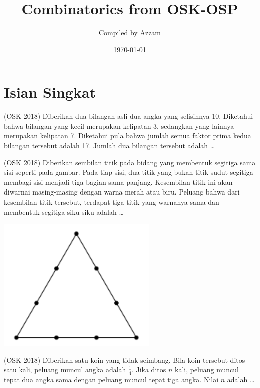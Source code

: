 \documentclass[11pt]{scrartcl}
\begin{document}
	\title{Combinatorics from OSK-OSP} %
	\date{\today}
	\author{Compiled by Azzam}
	\maketitle
	\section{Isian Singkat}
	
	\begin{soalbaru}(OSK 2018) Diberikan dua bilangan asli dua angka yang selisihnya 10. Diketahui bahwa bilangan yang kecil merupakan kelipatan 3, sedangkan yang lainnya merupakan kelipatan 7. Diketahui pula bahwa jumlah semua faktor prima kedua bilangan tersebut adalah 17. Jumlah dua bilangan tersebut adalah \dots
	
	\end{soalbaru}
	
	\begin{soalbaru}(OSK 2018)
Diberikan sembilan titik pada bidang yang membentuk segitiga sama sisi seperti pada gambar. Pada tiap
sisi, dua titik yang bukan titik sudut segitiga membagi sisi menjadi tiga bagian sama panjang. Kesembilan
titik ini akan diwarnai masing-masing dengan warna merah atau biru. Peluang bahwa dari kesembilan
titik tersebut, terdapat tiga titik yang warnanya sama dan membentuk segitiga siku-siku adalah \dots

\includegraphics[scale=0.5]{osk2018.PNG}
	\end{soalbaru}
	
	\begin{soalbaru}
	(OSK 2018) Diberikan satu koin yang tidak seimbang. Bila koin tersebut ditos satu kali, peluang muncul angka adalah $\frac{1}{4}$. Jika ditos $n$ kali, peluang muncul tepat dua angka sama dengan peluang muncul tepat tiga angka. Nilai $n$ adalah \dots
	\end{soalbaru}
	
\end{document}
